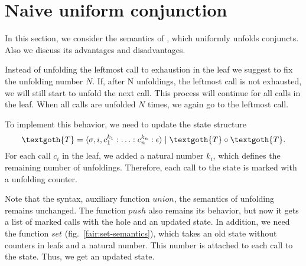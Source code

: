 \section{Naive uniform conjunction}

In this section, we consider the semantics of \mk, which uniformly unfolds conjuncts. Also we discuss its advantages and disadvantages.

Instead of unfolding the leftmost call to exhaustion in the leaf we suggest to fix the unfolding number $N$.  If, after N unfoldings, the leftmost call is not exhausted, we will still start to unfold the next call. This process will continue for all calls in the leaf. When all calls are unfolded $N$ times, we again go to the leftmost call.

To implement this behavior, we need to update the state structure
\[
\textgoth{T} = \inbr{\sigma, i, c_1^{k_1} : \ldots : c_n^{k_n} : \epsilon} \mid \textgoth{T} \circ \textgoth{T}.
\]
For each call $c_i$ in the leaf, we added a natural number $k_i$, which defines the remaining number of unfoldings. Therefore, each call to the state is marked with a unfolding counter. 

Note that the syntax, auxiliary function $union$, the semantics of unfolding remains unchanged. The function $push$ also remains its behavior, but now it gets a list of marked calls with the hole and an updated state. In addition, we need the function $set$ (fig.~\ref{fair:set-semantics}), which takes an old state without counters in leafs and a natural number. This number is attached to each call to the state. Thus, we get an updated state. 

